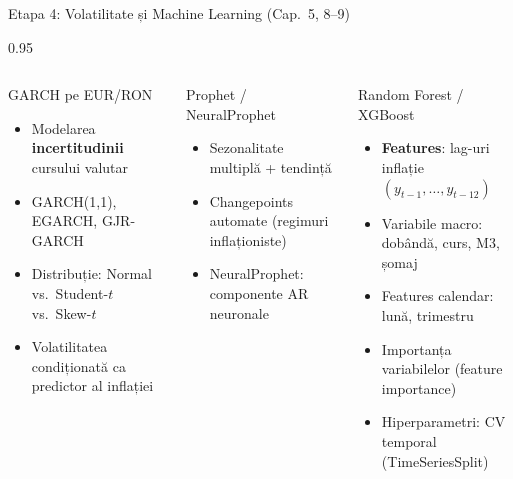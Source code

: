 \documentclass[9pt, aspectratio=169, t]{beamer}
\begin{document}
\begin{frame}{Etapa 4: Volatilitate și Machine Learning (Cap.\ 5, 8--9)}
    \begin{cminipage}{0.95\textwidth}
        {\footnotesize
        \begin{columns}[T]
            \begin{block}{GARCH pe EUR/RON}
                \begin{itemize}\setlength{\itemsep}{0pt}
                    \item Modelarea \textbf{incertitudinii} cursului valutar
                    \item GARCH(1,1), EGARCH, GJR-GARCH
                    \item Distribuție: Normal vs.\ Student-$t$ vs.\ Skew-$t$
                    \item Volatilitatea condiționată ca predictor al inflației
                \end{itemize}
            \end{block}

            \vspace{0.15cm}

            \begin{exampleblock}{Prophet / NeuralProphet}
                \begin{itemize}\setlength{\itemsep}{0pt}
                    \item Sezonalitate multiplă + tendință
                    \item Changepoints automate (regimuri inflaționiste)
                    \item NeuralProphet: componente AR neuronale
                \end{itemize}
            \end{exampleblock}

            \begin{alertblock}{Random Forest / XGBoost}
                \begin{itemize}\setlength{\itemsep}{0pt}
                    \item \textbf{Features}: lag-uri inflație $(y_{t-1}, \ldots, y_{t-12})$
                    \item Variabile macro: dobândă, curs, M3, șomaj
                    \item Features calendar: lună, trimestru
                    \item Importanța variabilelor (feature importance)
                    \item Hiperparametri: CV temporal (TimeSeriesSplit)
                \end{itemize}
            \end{alertblock}


\end{columns}}
\end{cminipage}
\end{frame}
\end{document}
